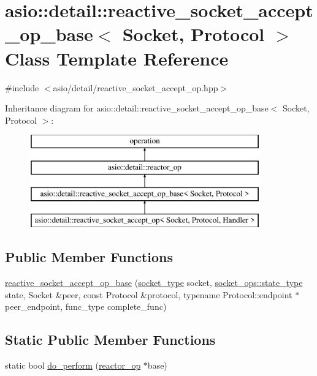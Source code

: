 \hypertarget{classasio_1_1detail_1_1reactive__socket__accept__op__base}{}\section{asio\+:\+:detail\+:\+:reactive\+\_\+socket\+\_\+accept\+\_\+op\+\_\+base$<$ Socket, Protocol $>$ Class Template Reference}
\label{classasio_1_1detail_1_1reactive__socket__accept__op__base}


{\ttfamily \#include $<$asio/detail/reactive\+\_\+socket\+\_\+accept\+\_\+op.\+hpp$>$}

Inheritance diagram for asio\+:\+:detail\+:\+:reactive\+\_\+socket\+\_\+accept\+\_\+op\+\_\+base$<$ Socket, Protocol $>$\+:\begin{figure}[H]
\begin{center}
\leavevmode
\includegraphics[height=4.000000cm]{classasio_1_1detail_1_1reactive__socket__accept__op__base}
\end{center}
\end{figure}
\subsection*{Public Member Functions}
\begin{DoxyCompactItemize}
\item 
\hyperlink{classasio_1_1detail_1_1reactive__socket__accept__op__base_a811f515a0346820671f1774bb27855a0}{reactive\+\_\+socket\+\_\+accept\+\_\+op\+\_\+base} (\hyperlink{namespaceasio_1_1detail_a6798c771dd84b79798b1a08150706ea9}{socket\+\_\+type} socket, \hyperlink{namespaceasio_1_1detail_1_1socket__ops_a5ce32ee297edef8833113ea35a933054}{socket\+\_\+ops\+::state\+\_\+type} state, Socket \&peer, const Protocol \&protocol, typename Protocol\+::endpoint $\ast$peer\+\_\+endpoint, func\+\_\+type complete\+\_\+func)
\end{DoxyCompactItemize}
\subsection*{Static Public Member Functions}
\begin{DoxyCompactItemize}
\item 
static bool \hyperlink{classasio_1_1detail_1_1reactive__socket__accept__op__base_ad3cbe11e482745edaf1b099956239998}{do\+\_\+perform} (\hyperlink{classasio_1_1detail_1_1reactor__op}{reactor\+\_\+op} $\ast$base)
\end{DoxyCompactItemize}
